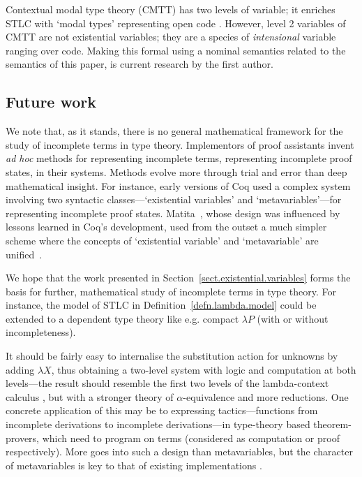 \documentclass[submission,copyright]{eptcs}
\begin{document}
Contextual modal type theory (CMTT) has two levels of variable; it enriches STLC with `modal types' representing open code \cite{nanevski:conmtt}.
However, level 2 variables of CMTT are not existential variables; they are a species of \emph{intensional} variable ranging over code.
Making this formal using a nominal semantics related to the semantics of this paper, is current research by the first author.


\subsection{Future work}


We note that, as it stands, there is no general mathematical framework for the study of incomplete terms in type theory.
Implementors of proof assistants invent \emph{ad hoc} methods for representing incomplete terms, representing incomplete proof states, in their systems.
Methods evolve more through trial and error than deep mathematical insight.
For instance, early versions of Coq used a complex system involving two syntactic classes---`existential variables' and `metavariables'---for representing incomplete proof states.
Matita~\cite{asperti:crafting:2007}, whose design was influenced by lessons learned in Coq's development, used from the outset a much simpler scheme where the concepts of `existential variable' and `metavariable' are unified~\cite{sacerdoti:thesis}.

We hope that the work presented in Section~\ref{sect.existential.variables} forms the basis for further, mathematical study of incomplete terms in type theory. 
For instance, the model of STLC in Definition~\ref{defn.lambda.model} could be extended to a dependent type theory like e.g. compact $\lambda P$ \cite[Subsection~14.2, Figure~14.1]{sorensen:lecchi-book} (with or without incompleteness).


It should be fairly easy to internalise the substitution action for unknowns by adding $\lambda X$, thus obtaining a two-level system with logic and computation at both levels---the result should resemble the first two levels of the lambda-context calculus \cite{gabbay:lamcce}, but with a stronger theory of $\alpha$-equivalence and more reductions. 
One concrete application of this may be to expressing tactics---functions from incomplete derivations to incomplete derivations---in type-theory based theorem-provers, which need to program on terms (considered as computation or proof respectively).  More goes into such a design than metavariables, but the character of metavariables is key to that of existing implementations \cite{pientka:belfpr}.
\end{document}
